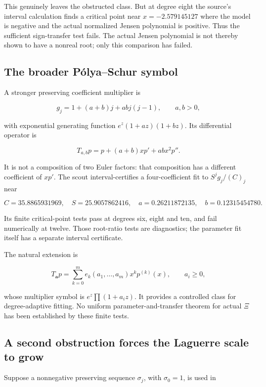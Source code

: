 \documentclass[
  10pt,
  a4paper,
  10pt,
  oneside,
  openany]{book}
\begin{document}
This genuinely leaves the obstructed class. But at degree eight the
source's interval calculation finds a critical point near
\(x=-2.579145127\) where the model is negative and the actual normalized
Jensen polynomial is positive. Thus the sufficient sign-transfer test
fails. The actual Jensen polynomial is not thereby shown to have a
nonreal root; only this comparison has failed.

\subsection{The broader Pólya--Schur
symbol}\label{the-broader-puxf3lyaschur-symbol}

A stronger preserving coefficient multiplier is

\[
 g_j=1+(a+b)j+abj(j-1),\qquad a,b>0,
\]

with exponential generating function \(e^z(1+az)(1+bz)\). Its
differential operator is

\[
 T_{a,b}p=p+(a+b)xp'+abx^2p''.
 \tag{32.4}\label{eq:32.4}
\]

It is not a composition of two Euler factors: that composition has a
different coefficient of \(xp'\). The scout interval-certifies a
four-coefficient fit to \(S^jg_j/(C)_j\) near

\[
 C=35.8865931969,\quad S=25.9057862416,
 \quad a=0.26211872135,\quad b=0.12315454780.
\]

Its finite critical-point tests pass at degrees six, eight and ten, and
fail numerically at twelve. Those root-ratio tests are diagnostics; the
parameter fit itself has a separate interval certificate.

The natural extension is

\[
 T_{\mathbf a}p=
 \sum_{k=0}^m e_k(a_1,\ldots,a_m)x^kp^{(k)}(x),
 \qquad a_i\ge0,
 \tag{32.5}\label{eq:32.5}
\]

whose multiplier symbol is \(e^z\prod(1+a_iz)\). It provides a
controlled class for degree-adaptive fitting. No uniform
parameter-and-transfer theorem for actual \(\Xi\) has been established
by these finite tests.

\subsection{A second obstruction forces the Laguerre scale to
grow}\label{a-second-obstruction-forces-the-laguerre-scale-to-grow}

Suppose a nonnegative preserving sequence \(\sigma_j\), with
\(\sigma_0=1\), is used in
\end{document}

